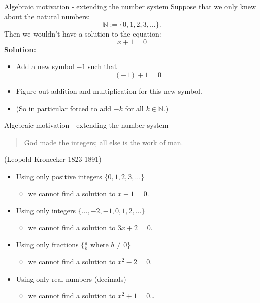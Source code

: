 \documentclass{beamer}
\begin{document}
\begin{frame}{Algebraic motivation - extending the number system}
Suppose that we only knew about the natural numbers:
\begin{equation*}
\mathbb{N} := \{0, 1, 2, 3, \dots\}.
\end{equation*}
Then we wouldn't have a solution to the equation:
\begin{equation*}
x + 1 = 0
\end{equation*}
{\bf Solution:}
\begin{itemize}
	\item Add a new symbol $-1$ such that
	\begin{equation*}
	(-1)+1 = 0
	\end{equation*}
	\item Figure out addition and multiplication for this new symbol.
	\item (So in particular forced to add $-k$ for all $k\in \mathbb{N}$.)
\end{itemize}
\end{frame}

\begin{frame}{Algebraic motivation - extending the number system}
\begin{quote}
God made the integers; all else is the work of man.
\end{quote}
(Leopold Kronecker 1823-1891)\vfill
\begin{itemize}
	\item Using only positive integers $\{0, 1, 2, 3, \dots\}$
	\begin{itemize}
		\item we cannot find a solution to $x+1 = 0$.
	\end{itemize}\vfill
	\item Using only integers $\{\dots, -2, -1, 0, 1, 2, \dots\}$
	\begin{itemize}
		\item we cannot find a solution to $3x+2 = 0$.
	\end{itemize}\vfill
	\item Using only fractions $\{\frac{a}{b} \text{ where } b\neq0 \}$
	\begin{itemize}
		\item we cannot find a solution to $x^2-2 =0$.
	\end{itemize}\vfill
	\item Using only real numbers (decimals)
	\begin{itemize}
		\item we cannot find a solution to $x^2 + 1 = 0$\dots
	\end{itemize}
\end{itemize}
\end{frame}
\end{document}
